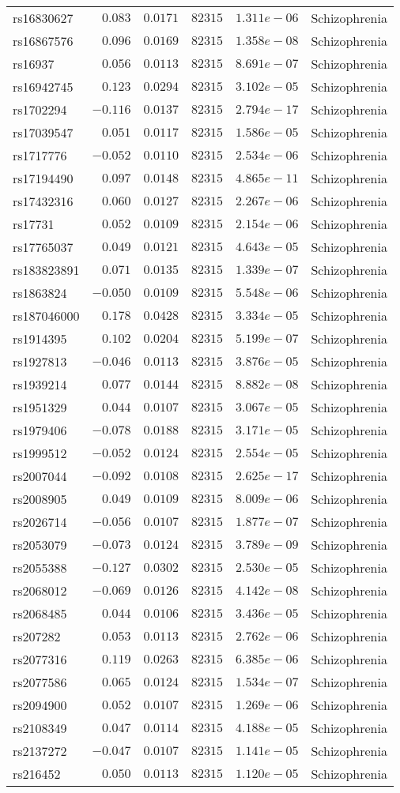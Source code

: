 \begin{tabular}{lrrrrl}
rs16830627&$ 0.083$&$0.0171$&$ 82315$&$1.311e-06$&Schizophrenia\tabularnewline
rs16867576&$ 0.096$&$0.0169$&$ 82315$&$1.358e-08$&Schizophrenia\tabularnewline
rs16937&$ 0.056$&$0.0113$&$ 82315$&$8.691e-07$&Schizophrenia\tabularnewline
rs16942745&$ 0.123$&$0.0294$&$ 82315$&$3.102e-05$&Schizophrenia\tabularnewline
rs1702294&$-0.116$&$0.0137$&$ 82315$&$2.794e-17$&Schizophrenia\tabularnewline
rs17039547&$ 0.051$&$0.0117$&$ 82315$&$1.586e-05$&Schizophrenia\tabularnewline
rs1717776&$-0.052$&$0.0110$&$ 82315$&$2.534e-06$&Schizophrenia\tabularnewline
rs17194490&$ 0.097$&$0.0148$&$ 82315$&$4.865e-11$&Schizophrenia\tabularnewline
rs17432316&$ 0.060$&$0.0127$&$ 82315$&$2.267e-06$&Schizophrenia\tabularnewline
rs17731&$ 0.052$&$0.0109$&$ 82315$&$2.154e-06$&Schizophrenia\tabularnewline
rs17765037&$ 0.049$&$0.0121$&$ 82315$&$4.643e-05$&Schizophrenia\tabularnewline
rs183823891&$ 0.071$&$0.0135$&$ 82315$&$1.339e-07$&Schizophrenia\tabularnewline
rs1863824&$-0.050$&$0.0109$&$ 82315$&$5.548e-06$&Schizophrenia\tabularnewline
rs187046000&$ 0.178$&$0.0428$&$ 82315$&$3.334e-05$&Schizophrenia\tabularnewline
rs1914395&$ 0.102$&$0.0204$&$ 82315$&$5.199e-07$&Schizophrenia\tabularnewline
rs1927813&$-0.046$&$0.0113$&$ 82315$&$3.876e-05$&Schizophrenia\tabularnewline
rs1939214&$ 0.077$&$0.0144$&$ 82315$&$8.882e-08$&Schizophrenia\tabularnewline
rs1951329&$ 0.044$&$0.0107$&$ 82315$&$3.067e-05$&Schizophrenia\tabularnewline
rs1979406&$-0.078$&$0.0188$&$ 82315$&$3.171e-05$&Schizophrenia\tabularnewline
rs1999512&$-0.052$&$0.0124$&$ 82315$&$2.554e-05$&Schizophrenia\tabularnewline
rs2007044&$-0.092$&$0.0108$&$ 82315$&$2.625e-17$&Schizophrenia\tabularnewline
rs2008905&$ 0.049$&$0.0109$&$ 82315$&$8.009e-06$&Schizophrenia\tabularnewline
rs2026714&$-0.056$&$0.0107$&$ 82315$&$1.877e-07$&Schizophrenia\tabularnewline
rs2053079&$-0.073$&$0.0124$&$ 82315$&$3.789e-09$&Schizophrenia\tabularnewline
rs2055388&$-0.127$&$0.0302$&$ 82315$&$2.530e-05$&Schizophrenia\tabularnewline
rs2068012&$-0.069$&$0.0126$&$ 82315$&$4.142e-08$&Schizophrenia\tabularnewline
rs2068485&$ 0.044$&$0.0106$&$ 82315$&$3.436e-05$&Schizophrenia\tabularnewline
rs207282&$ 0.053$&$0.0113$&$ 82315$&$2.762e-06$&Schizophrenia\tabularnewline
rs2077316&$ 0.119$&$0.0263$&$ 82315$&$6.385e-06$&Schizophrenia\tabularnewline
rs2077586&$ 0.065$&$0.0124$&$ 82315$&$1.534e-07$&Schizophrenia\tabularnewline
rs2094900&$ 0.052$&$0.0107$&$ 82315$&$1.269e-06$&Schizophrenia\tabularnewline
rs2108349&$ 0.047$&$0.0114$&$ 82315$&$4.188e-05$&Schizophrenia\tabularnewline
rs2137272&$-0.047$&$0.0107$&$ 82315$&$1.141e-05$&Schizophrenia\tabularnewline
rs216452&$ 0.050$&$0.0113$&$ 82315$&$1.120e-05$&Schizophrenia\tabularnewline

\end{tabular}
